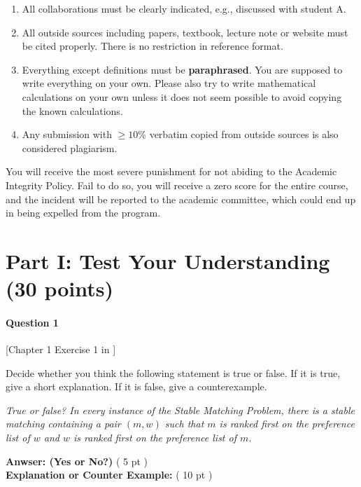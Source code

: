 \documentclass[11pt,letterpaper]{article}
\begin{document}
\begin{enumerate}
	\item All collaborations must be clearly indicated, e.g., discussed with student A. 
	\item All outside sources including papers, textbook, lecture note or website must be cited properly. There is no restriction in reference format. 
	\item Everything except definitions must be {\bf paraphrased}. You are supposed to write everything on your own. Please also try to write mathematical calculations on your own unless it does not seem possible to avoid copying the known calculations.
	\item Any submission with {\bf $\ge 10\%$} verbatim copied from outside sources is also considered plagiarism.
\end{enumerate}

You will receive the most severe punishment for not abiding to the Academic Integrity Policy. Fail to do so, you will receive a zero score for the entire course, and the incident will be reported to the academic committee, which could end up in being expelled from the program. 


\pagebreak

\section*{Part I: Test Your Understanding  (30 points)}


	\paragraph*{Question 1} [Chapter 1 Exercise 1 in \cite{KT05}]
	
	Decide whether you think the following statement is true or false. If it is true, give a short explanation. If it is false, give a counterexample.  

	\medskip
	
	\emph{True or false? In every instance of the Stable Matching Problem, there is a stable matching containing a pair $(m, w)$ such that $m$ is ranked first on the  preference list of $w$ and $w$ is ranked first on the preference list of $m$.}

	\medskip
	
	\noindent
	{\bf Anwser: (Yes or No?)} ( 5 pt )\\
	{\bf Explanation or Counter Example:} ( 10 pt )\\
\end{document}
